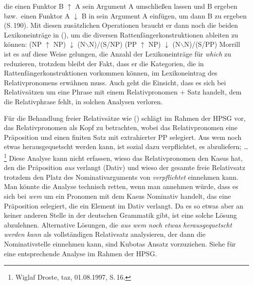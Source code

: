 die einen Funktor B $\uparrow$ A sein Argument A umschließen lassen und B ergeben bzw.\ einen Funktor A $\downarrow$
B in sein Argument A einfügen, um dann B zu ergeben (S.\,190). Mit diesen zusätzlichen Operationen
braucht er dann noch die beiden Lexikoneinträge in (), um die diversen
Rattenfängerkonstruktionen ableiten zu können:
\eal
\ex (NP $\uparrow$ NP) $\downarrow$ (N$\backslash$N)/(S/NP)
\ex (PP $\uparrow$ NP) $\downarrow$ (N$\backslash$N)/(S/PP)
\zl
Morrill ist es auf diese Weise gelungen, die Anzahl der Lexikoneinträge für \emph{which} zu
reduzieren, trotzdem bleibt der Fakt, dass er die Kategorien, die in Rattenfängerkonstruktionen
vorkommen können, im Lexikoneintrag des Relativpronomens erwähnen muss. 
Auch geht die Einsicht, dass es sich bei Relativsätzen um eine Phrase mit einem Relativpronomen
+ Satz handelt, dem die Relativphrase fehlt, in solchen Analysen verloren.

Für die Behandlung freier Relativsätze wie () schlägt \citet[, 164]{Kubota2003a-u} im
Rahmen der HPSG vor, das Relativpronomen als Kopf zu betrachten, wobei das Relativpronomen eine Präposition und einen finiten
Satz mit extrahierter PP selegiert.
\ea
Aus wem noch etwas herausgequetscht werden kann, ist sozial dazu verpflichtet, es abzuliefern; \ldots\footnote{
        Wiglaf Droste, taz, 01.08.1997, S.\,16.
      }
\z
Diese Analyse kann nicht erfassen, wieso das Relativpronomen den Kasus hat, den die Präposition
\emph{aus} verlangt (Dativ) und wieso der gesamte freie Relativsatz trotzdem den Platz des
Nominativarguments von \emph{verpflichtet} einnehmen kann. Man könnte die Analyse technisch retten,
wenn man annehmen würde, dass es sich bei \emph{wem} um ein Pronomen mit dem Kasus Nominativ handelt,
das eine Präposition selegiert, die ein Element im Dativ verlangt. Da es so etwas aber an keiner
anderen Stelle in der deutschen Grammatik gibt, ist eine solche Lösung abzulehnen. Alternative
Lösungen, die \emph{aus wem noch etwas herausgequetscht werden kann} als vollständigen Relativsatz
analysieren, der dann die Nominativstelle einnehmen kann, sind Kubotas Ansatz vorzuziehen. Siehe
 für eine entsprechende Analyse im Rahmen der HPSG.%


